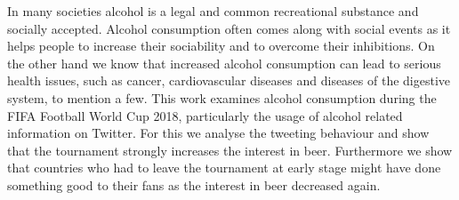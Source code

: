 In many societies alcohol is a legal and common recreational substance and socially accepted. Alcohol consumption often comes along with social events as it helps people to increase their sociability and to overcome their inhibitions. On the other hand we know that increased alcohol consumption can lead to serious health issues, such as cancer, cardiovascular diseases and diseases of the digestive system, to mention a few. This work examines alcohol consumption during the FIFA Football World Cup 2018, particularly the usage of alcohol related information on Twitter. For this we analyse the tweeting behaviour and show that the tournament strongly increases the interest in beer. Furthermore we show that countries who had to leave the tournament at early stage might have done something good to their fans as the interest in beer decreased again.

